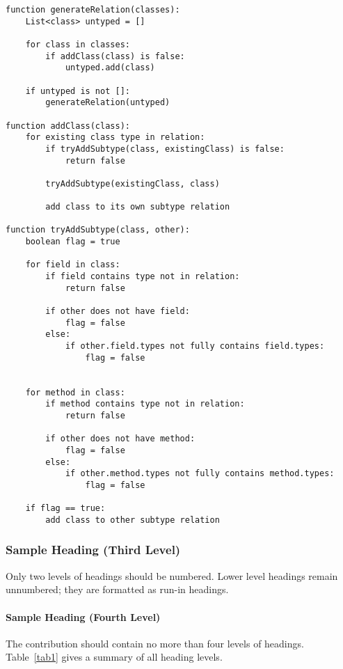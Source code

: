 \documentclass[runningheads]{llncs}
\begin{document}
\begin{verbatim}
function generateRelation(classes):
    List<class> untyped = []

    for class in classes:
        if addClass(class) is false:
            untyped.add(class)
    
    if untyped is not []:
        generateRelation(untyped)

function addClass(class):
    for existing class type in relation:
        if tryAddSubtype(class, existingClass) is false:
            return false

        tryAddSubtype(existingClass, class)        

        add class to its own subtype relation

function tryAddSubtype(class, other):
    boolean flag = true

    for field in class:
        if field contains type not in relation:
            return false

        if other does not have field:
            flag = false
        else:
            if other.field.types not fully contains field.types:
                flag = false 


    for method in class:
        if method contains type not in relation:
            return false

        if other does not have method:
            flag = false
        else:
            if other.method.types not fully contains method.types:
                flag = false

    if flag == true:
        add class to other subtype relation
\end{verbatim}

\subsubsection{Sample Heading (Third Level)}
Only two levels of headings should be numbered. Lower level headings remain unnumbered; they are 
formatted as run-in headings.

\paragraph{Sample Heading (Fourth Level)}
The contribution should contain no more than four levels of headings. Table~\ref{tab1} gives a 
summary of all heading levels.
\end{document}
